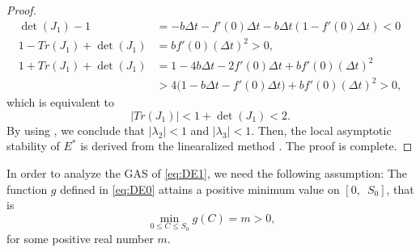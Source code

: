 \documentclass[12pt]{article}
\theoremstyle{definition}
\theoremstyle{remark}
\numberwithin{equation}{section}
\begin{document}
{\begin{proof}
\begin{equation*}
\begin{split}
\det(J_1) - 1 &= -b\Delta t - f'(0)\Delta t - b\Delta t(1 - f'(0)\Delta t) < 0\\
1 - Tr(J_1) + \det(J_1) &=  bf'(0)(\Delta t)^2> 0,\\
1 + Tr(J_1) + \det(J_1) &= 1 - 4b\Delta t - 2f'(0)\Delta t +  bf'(0)(\Delta t)^2\\
&> 4\big(1 - b\Delta t - f'(0)\Delta t\big) + bf'(0)(\Delta t)^2 > 0,
\end{split}
\end{equation*}
which is equivalent to
\begin{equation*}
|Tr(J_1)| < 1 + \det(J_1) < 2.
\end{equation*}
By using \cite[Theorem 2.10]{Allen1}, we conclude that $|\lambda_2| < 1$ and $|\lambda_3| < 1$. Then, the local asymptotic stability of $E^*$ is derived from the linearalized method \cite[Theorem 1.3.7]{Stuart}. The proof is complete.
\end{proof}
In order to analyze the GAS of \eqref{eq:DE1}, we need the following assumption: The function $g$ defined in \eqref{eq:DE0} attains a positive minimum value on $[0,\,\,\,S_0]$, that is 
\begin{equation}\label{eq:DE3a}\
\min_{0 \leq C \leq S_0}g(C) = m > 0,
\end{equation}
for some positive real number $m$.


}
\end{document}
